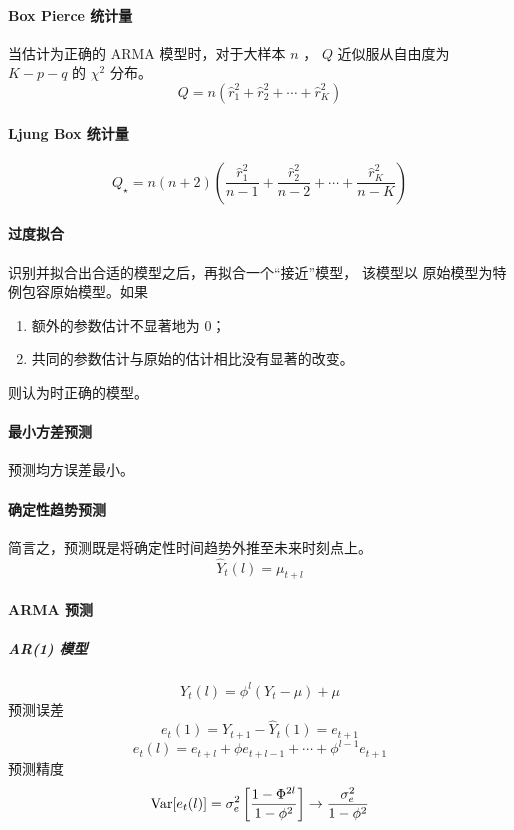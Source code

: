 \documentclass[UTF8,hyperref,a4paper]{ctexart}
\begin{document}
        \paragraph{Box Pierce 统计量} 当估计为正确的 ARMA 模型时，对于大样本 $ n $ ，
        $ Q $ 近似服从自由度为 $ K - p - q $ 的 $ \chi^2 $ 分布。
        $$ Q = n(\hat{r}_1^2 + \hat{r}_2^2 + \cdots + \hat{r}_K^2) $$

        \paragraph{Ljung Box 统计量} 
        $$ Q_\star = n(n+2) \left( 
            \frac{\hat{r}_1^2}{n-1} + \frac{\hat{r}_2^2}{n-2} + \cdots + \frac{\hat{r}_K^2}{n-K}
        \right) $$ 

        \paragraph{过度拟合} 识别并拟合出合适的模型之后，再拟合一个“接近”模型，
        该模型以 原始模型为特例包容原始模型。如果
        \begin{enumerate}
            \item 额外的参数估计不显著地为 0； 
            \item 共同的参数估计与原始的估计相比没有显著的改变。
        \end{enumerate}
        则认为时正确的模型。

        \paragraph{最小方差预测} 预测均方误差最小。

        \paragraph{确定性趋势预测} 简言之，预测既是将确定性时间趋势外推至未来时刻点上。
        $$ \hat{Y}_t (l) = \mu_{t+l} $$
        
        \paragraph{ARMA 预测} 
        \subparagraph{AR(1) 模型} $$ Y_t(l) = \phi^l (Y_t - \mu) + \mu $$ 
        预测误差
        $$ e_t(1) = Y_{t+1} - \hat{Y}_t(1) = e_{t+1} $$ 
        $$ e_t(l) = e_{t+l} + \phi e_{t+l-1} + \cdots + \phi^{l-1} e_{t+1} $$ 
        预测精度
        $$ \mathrm{Var} [e_t(l)] = \sigma_e^2 \left[ \frac{1 - \Phi^{2l}}{1 - \phi^2} \right] \rightarrow \frac{\sigma_e^2}{1 - \phi^2} $$ 
        
\end{document}

